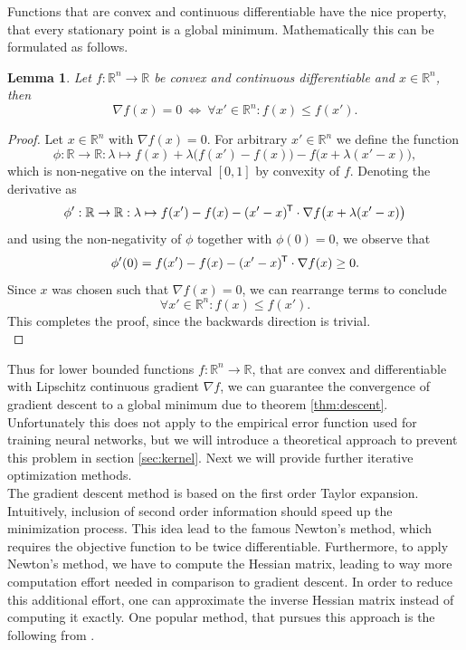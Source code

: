 \documentclass[11pt, a4paper]{article}
\newtheorem{lemma}[theorem]{Lemma}
\newcommand{\R}{\mathbb{R}}
\newcommand*{\tr}{^{\mkern-1.5mu\mathsf{T}}}
\begin{document}
Functions that are convex and continuous differentiable have the nice property, that every stationary point is a global minimum. Mathematically this can be formulated as follows.

\begin{lemma}
Let $f: \R^n \to \R$ be convex and continuous differentiable and $x \in \R^n$, then
\[ \nabla f(x) = 0 \ \Leftrightarrow \ \forall x' \in \R^n : f(x) \leq f(x').  \]
\end{lemma}

\begin{proof}
Let $x \in \R^n$ with $\nabla f(x) = 0$. For arbitrary $x' \in \R^n$ we define the function
\[ \phi : \R \to \R : \lambda \mapsto f(x) + \lambda \big ( f(x') - f(x) \big ) - f \big ( x + \lambda (x'-x) \big ), \]
which is non-negative on the interval $[0,1]$ by convexity of $f$. Denoting the derivative as
\[ \phi' : \R \to \R : \lambda \mapsto f(x') - f(x) - (x'-x) \tr \cdot \nabla f \big (x + \lambda(x'-x)\big ) \]
and using the non-negativity of $\phi$ together with $\phi(0) = 0$, we observe that
\[ \phi'(0) = f(x') - f(x) - (x'-x) \tr \cdot \nabla f(x) \geq 0. \]
Since $x$ was chosen such that $\nabla f(x) = 0$, we can rearrange terms to conclude
\[ \forall x' \in \R^n : f(x) \leq f(x'). \]
This completes the proof, since the backwards direction is trivial. \\
\end{proof}

Thus for lower bounded functions $f: \R^n \to \R$, that are convex and differentiable with Lipschitz continuous gradient $\nabla f$, we can guarantee the convergence of gradient descent to a global minimum due to theorem \ref{thm:descent}. Unfortunately this does not apply to the empirical error function used for training neural networks, but we will introduce a theoretical approach to prevent this problem in section \ref{sec:kernel}. Next we will provide further iterative optimization methods. \\

The gradient descent method is based on the first order Taylor expansion. Intuitively, inclusion of second order information should speed up the minimization process. This idea lead to the famous Newton's method, which requires the objective function to be twice differentiable. Furthermore, to apply Newton's method, we have to compute the Hessian matrix, leading to way more computation effort needed in comparison to gradient descent. In order to reduce this additional effort, one can approximate the inverse Hessian matrix instead of computing it exactly. One popular method, that pursues this approach is the following from \cite{BFGS}.
\end{document}
